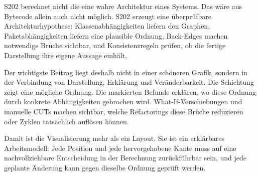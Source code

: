 \documentclass[a4paper,11pt]{article}
\begin{document}
S202 berechnet nicht die eine wahre Architektur eines Systems. Das w\"are aus
Bytecode allein auch nicht m\"oglich. S202 erzeugt eine \"uberpr\"ufbare
Architekturhypothese: Klassenabh\"angigkeiten liefern den Graphen,
Paketabh\"angigkeiten liefern eine plausible Ordnung, Back-Edges machen
notwendige Br\"uche sichtbar, und Konsistenzregeln pr\"ufen, ob die fertige
Darstellung ihre eigene Aussage einh\"alt.

Der wichtigste Beitrag liegt deshalb nicht in einer sch\"oneren Grafik, sondern
in der Verbindung von Darstellung, Erkl\"arung und Ver\"anderbarkeit. Die
Schichtung zeigt eine m\"ogliche Ordnung. Die markierten Befunde erkl\"aren,
wo diese Ordnung durch konkrete Abh\"angigkeiten gebrochen wird. What-If-Verschiebungen
und manuelle CUTs machen sichtbar, welche Refactorings diese Br\"uche reduzieren
oder Zyklen tats\"achlich aufl\"osen k\"onnen.

Damit ist die Visualisierung mehr als ein Layout. Sie ist ein erkl\"arbares
Arbeitsmodell: Jede Position und jede hervorgehobene Kante muss auf eine
nachvollziehbare Entscheidung in der Berechnung zur\"uckf\"uhrbar sein, und
jede geplante \"Anderung kann gegen dieselbe Ordnung gepr\"uft werden.
\end{document}
